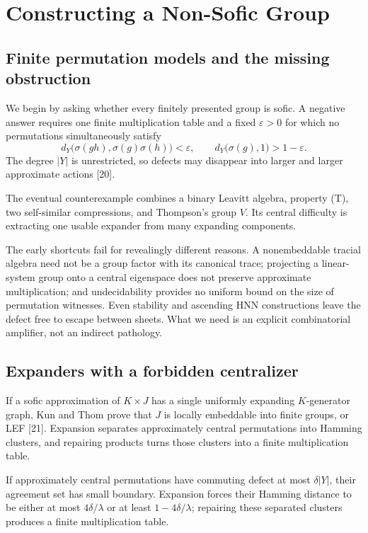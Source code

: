 \documentclass[10pt,openany]{book}
\newcommand{\refnum}[1]{\textnormal{[#1]}}
\begin{document}
\setcounter{page}{10}
\setcounter{chapter}{2}
\chapter{Constructing a Non-Sofic Group}

\section{Finite permutation models and the missing obstruction}

We begin by asking whether every finitely presented group is sofic. A negative answer requires one finite multiplication table and a fixed $\varepsilon>0$ for which no permutations simultaneously satisfy
\[
 d_Y\bigl(\sigma(gh),\sigma(g)\sigma(h)\bigr)<\varepsilon,
 \qquad
 d_Y\bigl(\sigma(g),1\bigr)>1-\varepsilon.
\]
The degree $|Y|$ is unrestricted, so defects may disappear into larger and larger approximate actions \refnum{20}.

The eventual counterexample combines a binary Leavitt algebra, property (T), two self-similar compressions, and Thompson's group $V$. Its central difficulty is extracting one usable expander from many expanding components.

The early shortcuts fail for revealingly different reasons. A nonembeddable tracial algebra need not be a group factor with its canonical trace; projecting a linear-system group onto a central eigenspace does not preserve approximate multiplication; and undecidability provides no uniform bound on the size of permutation witnesses. Even stability and ascending HNN constructions leave the defect free to escape between sheets. What we need is an explicit combinatorial amplifier, not an indirect pathology.

\section{Expanders with a forbidden centralizer}

If a sofic approximation of $K\times J$ has a single uniformly expanding $K$-generator graph, Kun and Thom prove that $J$ is locally embeddable into finite groups, or LEF \refnum{21}. Expansion separates approximately central permutations into Hamming clusters, and repairing products turns those clusters into a finite multiplication table.

If approximately central permutations have commuting defect at most $\delta|Y|$, their agreement set has small boundary. Expansion forces their Hamming distance to be either at most $4\delta/\lambda$ or at least $1-4\delta/\lambda$; repairing these separated clusters produces a finite multiplication table.
\end{document}
